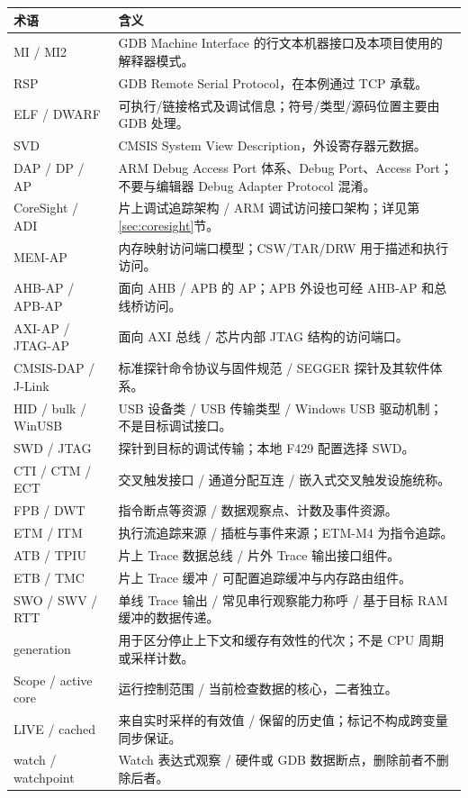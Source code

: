 \documentclass[UTF8,a4paper,11pt,oneside,fontset=none]{ctexart}
\begin{document}
\begin{longtable}{@{}P{32mm}P{129mm}@{}}\toprule
术语 & 含义\\\midrule\endhead
MI / MI2 & GDB Machine Interface 的行文本机器接口及本项目使用的解释器模式。\\
RSP & GDB Remote Serial Protocol，在本例通过 TCP 承载。\\
ELF / DWARF & 可执行/链接格式及调试信息；符号/类型/源码位置主要由 GDB 处理。\\
SVD & CMSIS System View Description，外设寄存器元数据。\\
DAP / DP / AP & ARM Debug Access Port 体系、Debug Port、Access Port；不要与编辑器 Debug Adapter Protocol 混淆。\\
CoreSight / ADI & 片上调试追踪架构 / ARM 调试访问接口架构；详见第\ref{sec:coresight}节。\\
MEM-AP & 内存映射访问端口模型；CSW/TAR/DRW 用于描述和执行访问。\\
AHB-AP / APB-AP & 面向 AHB / APB 的 AP；APB 外设也可经 AHB-AP 和总线桥访问。\\
AXI-AP / JTAG-AP & 面向 AXI 总线 / 芯片内部 JTAG 结构的访问端口。\\
CMSIS-DAP / J-Link & 标准探针命令协议与固件规范 / SEGGER 探针及其软件体系。\\
HID / bulk / WinUSB & USB 设备类 / USB 传输类型 / Windows USB 驱动机制；不是目标调试接口。\\
SWD / JTAG & 探针到目标的调试传输；本地 F429 配置选择 SWD。\\
CTI / CTM / ECT & 交叉触发接口 / 通道分配互连 / 嵌入式交叉触发设施统称。\\
FPB / DWT & 指令断点等资源 / 数据观察点、计数及事件资源。\\
ETM / ITM & 执行流追踪来源 / 插桩与事件来源；ETM-M4 为指令追踪。\\
ATB / TPIU & 片上 Trace 数据总线 / 片外 Trace 输出接口组件。\\
ETB / TMC & 片上 Trace 缓冲 / 可配置追踪缓冲与内存路由组件。\\
SWO / SWV / RTT & 单线 Trace 输出 / 常见串行观察能力称呼 / 基于目标 RAM 缓冲的数据传递。\\
generation & 用于区分停止上下文和缓存有效性的代次；不是 CPU 周期或采样计数。\\
Scope / active core & 运行控制范围 / 当前检查数据的核心，二者独立。\\
LIVE / cached & 来自实时采样的有效值 / 保留的历史值；标记不构成跨变量同步保证。\\
watch / watchpoint & Watch 表达式观察 / 硬件或 GDB 数据断点，删除前者不删除后者。\\\bottomrule
\end{longtable}
\end{document}
